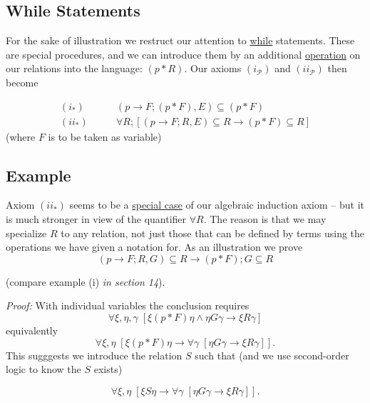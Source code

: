 \documentclass{article}
\newcommand{\scP}{\mathscr{P}}
\begin{document}
\subsection{While Statements}
 For the sake of illustration we restruct our attention to \underline{while} statements. These are special procedures, and we can introduce them by an additional \underline{operation} on our relations into the language: $(p * R)$. Our axioms $(i_\scP)$ and $(ii_\scP)$ then become

\begin{align*}
    (i_{*})\quad\quad & (p \to F; (p*F), E) \subseteq (p*F) \\
    (ii_{*})\quad\quad & \forall R; [(p \to F; R, E) \subseteq R \to (p*F) \subseteq R]
\end{align*}
(where $F$ is to be taken as variable)

\subsection{Example}

Axiom $(ii_{*})$ seems to be a \underline{special case} of our algebraic induction axiom -- but it is much stronger in view of the quantifier $\forall R$. The reason is that we may specialize $R$ to any relation, not just those that can be defined by terms using the operations we have given a notation for. As an illustration we prove 
\begin{equation*}
    (p \to F; R, G) \subseteq R \rightarrow (p*F);G \subseteq R
\end{equation*}

(compare example (i) \textit{in section 14}). 

\textit{Proof:} With individual variables the conclusion requires 
\begin{equation*}
    \forall \xi, \eta, \gamma \; [ \xi (p*F) \eta \wedge \eta G \gamma \to \xi R \gamma]
\end{equation*}
equivalently 
\begin{equation*}
    \forall \xi, \eta \; [ \xi (p*F) \eta \to \forall \gamma \; [ \eta G \gamma \to \xi R \gamma ]].
\end{equation*}
This sugggests we introduce the relation $S$ such that (and we use second-order logic to know the $S$ exists)

\begin{equation*}
    \forall \xi, \eta \; [ \xi S \eta \to \forall \gamma \; [ \eta G \gamma \to \xi R \gamma ]].
\end{equation*}
\end{document}
